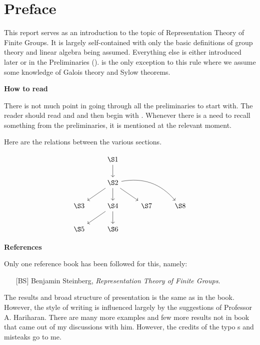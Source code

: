 \section*{Preface}
This report serves as an introduction to the topic of Representation Theory of Finite Groups. It is largely self-contained with only the basic definitions of group theory and linear algebra being assumed. Everything else is either introduced later or in the Preliminaries ().  is the only exception to this rule where we assume some knowledge of Galois theory and Sylow theorems.

\textbf{How to read}

There is not much point in going through all the preliminaries to start with. The reader should read  and  and then begin with . Whenever there is a need to recall something from the preliminaries, it is mentioned at the relevant moment.

Here are the relations between the various sections.

\begin{equation*} 
	\begin{tikzcd}
		    & \S1 \arrow[d]                                              &     &     \\
		    & \S2 \arrow[d] \arrow[ld] \arrow[rd] \arrow[rrd, bend left] &     &     \\
		\S3 & \S4 \arrow[ld] \arrow[d]                                   & \S7 & \S8 \\
		\S5 & \S6                                                        &     &    
	\end{tikzcd}
\end{equation*}

\textbf{References}

Only one reference book has been followed for this, namely:

\begin{itemize}
	\item[{[BS]}] Benjamin Steinberg, \emph{Representation Theory of Finite Groups}.
\end{itemize}

The results and broad structure of presentation is the same as in the book. However, the style of writing is influenced largely by the suggestions of Professor A. Hariharan. There are many more examples and few more results not in book that came out of my discussions with him. However, the credits of the typo s and misteaks go to me.
